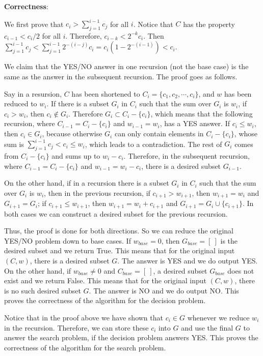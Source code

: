 \documentclass{article}
\begin{document}
\noindent\textbf{Correctness}:


We first prove that $c_i>\sum_{j=1}^{i-1}c_j$ for all $i$. Notice that $C$ has the property $c_{i-1}<c_i/2$ for all $i$. Therefore, $c_{i-k}<2^{-k}c_i$. Then $\sum_{j=1}^{i-1}c_j<\sum_{j=1}^{i-1}2^{-(i-j)}c_i=c_i(1-2^{-(i-1)})<c_i$.

We claim that the YES/NO answer in one recursion (not the base case) is the same as the answer in the subsequent recursion. The proof goes as follows.

Say in a resursion, $C$ has been shortened to $C_i=\{c_1,c_2,\cdots,c_i\}$, and $w$ has been reduced to $w_i$. If there is a subset $G_i$ in $C_i$ such that the sum over $G_i$ is $w_i$, if $c_i>w_i$, then $c_i\notin G_i$. Therefore $G_i\subset C_i-\{c_i\}$, which means that the following recursion, where $C_{i-1}=C_i-\{c_i\}$ and $w_{i-1}=w_i$, has a YES answer. If $c_i\leqslant w_i$, then $c_i\in G_i$, because otherwise $G_i$ can only contain elements in $C_i-\{c_i\}$, whose sum is $\sum_{j=1}^{i-1}c_j<c_i\leqslant w_i$, which leads to a contradiction. The rest of $G_i$ comes from $C_i-\{c_i\}$ and sums up to $w_i-c_i$. Therefore, in the subsequent recursion, where $C_{i-1}=C_i-\{c_i\}$ and $w_{i-1}=w_i-c_i$, there is a desired subset $G_{i-1}$.

On the other hand, if in a recursion there is a subset $G_i$ in $C_i$ such that the sum over $G_i$ is $w_i$, then in the previous recursion, if $c_{i+1}>w_{i+1}$, then $w_{i+1}=w_i$ and $G_{i+1}=G_i$; if $c_{i+1}\leqslant w_{i+1}$, then $w_{i+1}=w_i+c_{i+1}$ and $G_{i+1}=G_i\cup\{c_{i+1}\}$. In both cases we can construct a desired subset for the previous recursion.

Thus, the proof is done for both directions. So we can reduce the original YES/NO problem down to base cases. If $w_{base}=0$, then $G_{base}=[~]$ is the desired subset and we return True. This means that for the original input $(C,w)$, there is a desired subset $G$. The answer is YES and we do output YES. On the other hand, if $w_{base}\neq0$ and $C_{base}=[~]$, a desired subset $G_{base}$ does not exist and we return False. This means that for the original input $(C,w)$, there is no such desired subset $G$. The answer is NO and we do output NO.  This proves the correctness of the algorithm for the decision problem.

Notice that in the proof above we have shown that $c_i\in G$ whenever we reduce $w_i$ in the recursion. Therefore, we can store these $c_i$ into $G$ and use the final $G$ to answer the search problem, if the decision problem answers YES. This proves the correctness of the algorithm for the search problem.
\end{document}
